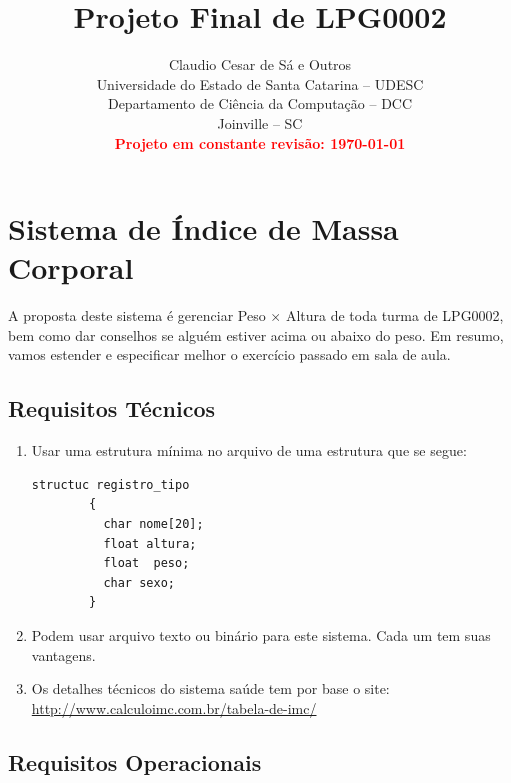 \documentclass[12pt,a4paper]{article}
\title{Projeto Final de LPG0002}
\author{Claudio Cesar de Sá e Outros\\ 
	Universidade do Estado de Santa Catarina -- UDESC\\
	Departamento de Ciência da Computação -- DCC\\
	Joinville -- SC\\
	\textcolor{red}{\textbf{Projeto em constante revisão: \today}}
	}
\begin{document}
\maketitle


\tableofcontents


\newpage
\section{Sistema de Índice de Massa Corporal}

A proposta deste sistema é gerenciar Peso $\times $ Altura de toda turma de LPG0002,
bem como dar conselhos se alguém estiver acima ou abaixo do peso. Em resumo,
vamos estender e especificar melhor o exercício passado em sala de aula.



\subsection{Requisitos Técnicos}

\begin{enumerate}
  \item Usar uma estrutura mínima no arquivo de uma estrutura que se segue:
  
\begin{verbatim}
structuc registro_tipo
        {
          char nome[20];
          float altura;
          float  peso;
          char sexo;
        }
\end{verbatim}



\item Podem usar arquivo texto ou binário para este sistema. Cada um tem suas vantagens.

\item Os detalhes técnicos do sistema saúde tem por base o site:
\url{http://www.calculoimc.com.br/tabela-de-imc/}

\end{enumerate}

\subsection{Requisitos Operacionais}
\end{document}

